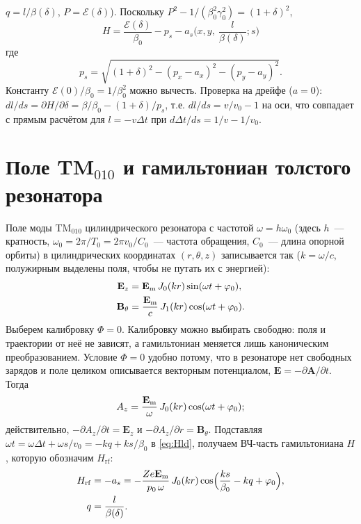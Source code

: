 \documentclass[a4paper,11pt]{article}
\numberwithin{equation}{section}
\newcommand{\rf}{\mathrm{rf}}
\newcommand{\cE}{\mathcal{E}}
\begin{document}
$q=l/\beta(\delta)$, $P=\cE(\delta)$). Поскольку $P^2-1/(\beta_0^2\gamma_0^2)=(1+\delta)^2$,
\begin{equation}
\boxed{\ H=\frac{\cE(\delta)}{\beta_0}-p_s-a_s\Big(x,y,\ \frac{l}{\beta(\delta)};s\Big)\ } \label{eq:Hld}
\end{equation}
где
\begin{equation*}
p_s=\sqrt{(1+\delta)^2-(p_x-a_x)^2-(p_y-a_y)^2}.
\end{equation*}
Константу $\cE(0)/\beta_0=1/\beta_0^2$ можно вычесть. Проверка на дрейфе ($a=0$):
$dl/ds=\partial H/\partial\delta=\beta/\beta_0-(1+\delta)/p_s$, т.е. $dl/ds=v/v_0-1$ на оси,
что совпадает с прямым расчётом для $l=-v\Delta t$ при $d\Delta t/ds=1/v-1/v_0$.

\section{Поле TM$_{010}$ и гамильтониан толстого резонатора}
Поле моды TM$_{010}$ цилиндрического резонатора с частотой $\omega=h\omega_0$ (здесь $h$~--- кратность,
$\omega_0=2\pi/T_0=2\pi v_0/C_0$~--- частота обращения, $C_0$~--- длина опорной орбиты) в цилиндрических координатах
$(r,\theta,z)$ записывается так ($k=\omega/c$, полужирным выделены поля, чтобы не путать их с энергией):
\begin{align}
\mathbf E_z&=\mathbf E_{\rm m}\,J_0(kr)\sin(\omega t+\varphi_0),\\
\mathbf B_\theta&=\frac{\mathbf E_{\rm m}}{c}\,J_1(kr)\cos(\omega t+\varphi_0).
\end{align}
Выберем калибровку $\Phi=0$. Калибровку можно выбирать свободно: поля и траектории от неё не зависят, а
гамильтониан меняется лишь каноническим преобразованием. Условие $\Phi=0$ удобно потому, что в резонаторе нет
свободных зарядов и поле целиком описывается векторным потенциалом, $\mathbf E=-\partial\mathbf A/\partial t$. Тогда
\begin{equation}
A_z=\frac{\mathbf E_{\rm m}}{\omega}\,J_0(kr)\cos(\omega t+\varphi_0);
\end{equation}
действительно, $-\partial A_z/\partial t=\mathbf E_z$ и $-\partial A_z/\partial r=\mathbf B_\theta$. Подставляя
$\omega t=\omega\Delta t+\omega s/v_0=-kq+ks/\beta_0$ в \eqref{eq:Hld}, получаем ВЧ-часть гамильтониана $H$, которую обозначим $H_\rf$:
\begin{equation}
\begin{aligned}
H_\rf&=-a_s=-\frac{Ze\mathbf E_{\rm m}}{p_0\,\omega}\,J_0(kr)\cos\!\Big(\frac{ks}{\beta_0}-kq+\varphi_0\Big),\\
q&=\frac{l}{\beta(\delta)} .
\end{aligned}
\end{equation}
\end{document}
